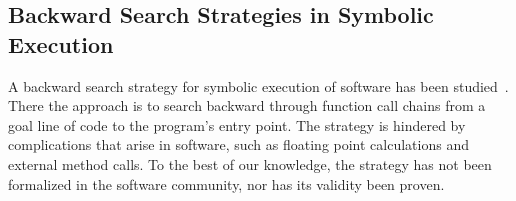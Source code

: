 \subsection{Backward Search Strategies in Symbolic Execution}

A backward search strategy for symbolic execution of software has been
studied~\cite{ma2011directed,chandra09,dinges04,charreteur10}. 
  There the approach is to search
backward through function call chains from a goal line of code to the program's
entry point. The strategy is hindered by complications that arise in software,
such as floating point calculations and external method calls. To the best of our knowledge, the strategy has not been formalized
in the software community, nor has its validity been proven.

